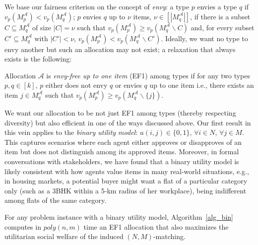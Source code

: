 \documentclass[11pt,dvipdfmx]{article}
\newcommand{\poly}{\mathit{poly}}
\begin{document}
We base our fairness criterion on the concept of \emph{envy}: a type $p$ envies a type $q$ if $v_p(M^\mathcal{A}_p) < v_p(M^\mathcal{A}_q)$; $p$ envies $q$ up to $\nu$ items, $\nu \in [|M^\mathcal{A}_q|]$, if there is a subset $C \subseteq M^\mathcal{A}_q$ of size $|C|=\nu$ such that $v_p(M^\mathcal{A}_p) \ge v_p(M^\mathcal{A}_q \backslash C)$ and, for every subset $C' \subseteq M^\mathcal{A}_q$ with $|C'| < \nu$, $v_p(M^\mathcal{A}_p) < v_p(M^\mathcal{A}_q \backslash C')$. Ideally, we want no type to envy another but such an allocation may not exist; a relaxation that always exists is the following:
\begin{definition}\label{defn:tef1}
	Allocation $\mathcal{A}$ is \emph{envy-free up to one item} (EF1) among types if for any two types $p,q \in [k]$, $p$ either does not envy $q$ or envies $q$ up to one item i.e., there exists an item $j \in M^\mathcal{A}_q$ such that $v_p(M^\mathcal{A}_p) \ge v_p(M^\mathcal{A}_q \backslash \{j\})$.
\end{definition}
We want our allocation to be not just EF1 among types (thereby respecting diversity) but also efficient in one of the ways discussed above. Our first result in this vein applies to the \emph{binary utility model}: $u(i,j) \in \{0,1\}$, $\forall i \in N$, $\forall j \in M$.
This captures scenarios where each agent either approves or disapproves of an item but does not distinguish among its approved items.  %
Moreover, in formal conversations with stakeholders, we have found that a binary utility model is likely consistent with how agents value items in many real-world situations, e.g., in housing markets, a potential buyer might want a flat of a particular category only (such as a 3BHK within a 5-km radius of her workplace), being indifferent among flats of the same category.
\begin{theorem}\label{thm:bin_all}
	For any problem instance with a binary utility model, Algorithm~\ref{alg_bin} computes in $\poly(n,m)$ time an EF1 allocation that also maximizes the utilitarian social welfare of the induced $(N,M)$-matching.
\end{theorem}
\end{document}
